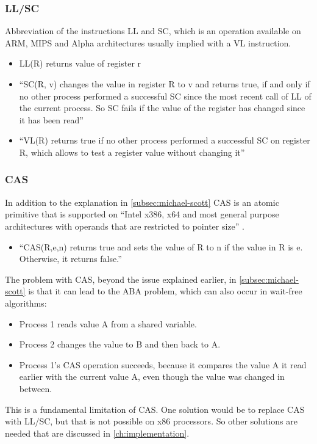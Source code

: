 \subsubsection{\acf{LL/SC}}\label{subsubsec:llsc}
Abbreviation of the instructions \ac{LL} and \ac{SC}, which is an operation available on ARM, MIPS and Alpha architectures usually implied with a \ac{VL} instruction.
\begin{itemize}
    \item \ac{LL}(R) returns value of register r
    \item \enquote{\ac{SC}(R, v) changes the value in register R to v and returns true, if and only if no other process performed a successful SC since the most recent call of LL of the current process. So SC fails if the value of the register has changed since it has been read} \cite{Fuchs2014EvaluationOT}
    \item \enquote{\ac{VL}(R) returns true if no other process performed a successful SC on register R, which allows to test a register value without changing it} \cite{Fuchs2014EvaluationOT}
\end{itemize}
\cite{Fuchs2014EvaluationOT}

\subsubsection{\acf{CAS}}\label{subsubsec:compare-and-swap}
In addition to the explanation in \cref{subsec:michael-scott} \ac{CAS} is an atomic primitive that is supported on \enquote{Intel x386, x64 and most general purpose architectures with operands that are restricted to pointer size} \cite{Fuchs2014EvaluationOT}.
\begin{itemize}
    \item \enquote{\ac{CAS}(R,e,n) returns true and sets the value of R to n if the value in R is e. Otherwise, it returns false.} \cite{Fuchs2014EvaluationOT}
\end{itemize}
The problem with \ac{CAS}, beyond the issue explained earlier, in \cref{subsec:michael-scott} is that it can lead to the ABA problem, which can also occur in wait-free algorithms:
\begin{itemize}
    \item Process 1 reads value A from a shared variable.
    \item Process 2 changes the value to B and then back to A.
    \item Process 1's \ac{CAS} operation succeeds, because it compares the value A it read earlier with the current value A, even though the value was changed in between.
\end{itemize}
This is a fundamental limitation of \ac{CAS}. One solution would be to replace \ac{CAS} with \ac{LL/SC}, but that is not possible on x86 processors. So other solutions are needed that are discussed in \cref{ch:implementation}. \cite{Fuchs2014EvaluationOT}

